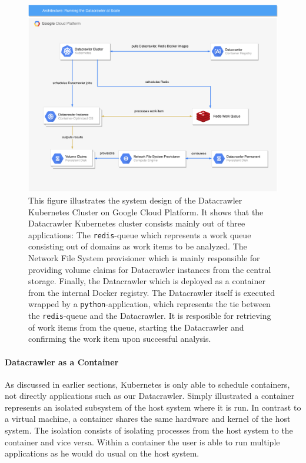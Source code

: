 \begin{figure}
	\centering
	\includegraphics[scale=0.5]{resources/datacrawler_k8s_architecture}
	\caption[System Design of "Running the Datacrawler at Scale"]{This figure illustrates the system design of the Datacrawler Kubernetes Cluster on Google Cloud Platform. It shows that the Datacrawler Kubernetes cluster consists mainly out of three applications: The \texttt{redis}-queue which represents a work queue consisting out of domains as work items to be analyzed. The Network File System provisioner which is mainly responsible for providing volume claims for Datacrawler instances from the central storage. Finally, the Datacrawler which is deployed as a container from the internal Docker registry. The Datacrawler itself is executed wrapped by a \texttt{python}-application, which represents the tie between the \texttt{redis}-queue and the Datacrawler. It is resposible for retrieving of work items from the queue, starting the Datacrawler and confirming the work item upon successful analysis.}
	\label{datacrawler_k8s_architecture}
\end{figure}
\paragraph*{Datacrawler as a Container}
\label{datacrawler_container}

As discussed in earlier sections, Kubernetes is only able to schedule containers, not directly applications such as our Datacrawler. Simply illustrated a container represents an isolated subsystem of the host system where it is run. In contrast to a virtual machine, a container shares the same hardware and kernel of the host system. The isolation consists of isolating processes from the host system to the container and vice versa. Within a container the user is able to run multiple applications as he would do usual on the host system. 

